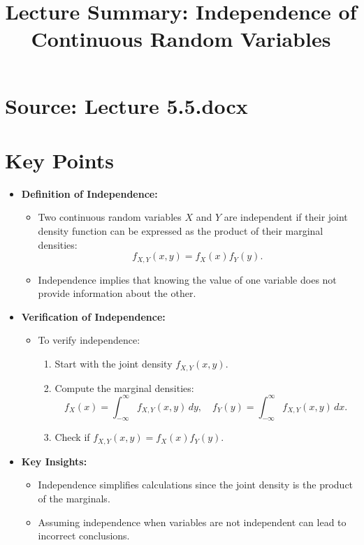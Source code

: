 \documentclass{article}
\title{Lecture Summary: Independence of Continuous Random Variables}
\author{}
\date{}
\begin{document}
\maketitle

\section*{Source: Lecture 5.5.docx}

\section*{Key Points}

\begin{itemize}
  \item \textbf{Definition of Independence:}
    \begin{itemize}
      \item Two continuous random variables $X$ and $Y$ are independent if their joint density function can be expressed as the product of their marginal densities:
        \[
          f_{X,Y}(x,y) = f_X(x) f_Y(y).
        \]
      \item Independence implies that knowing the value of one variable does not provide information about the other.
    \end{itemize}

  \item \textbf{Verification of Independence:}
    \begin{itemize}
      \item To verify independence:
        \begin{enumerate}
          \item Start with the joint density $f_{X,Y}(x,y)$.
          \item Compute the marginal densities:
            \[
              f_X(x) = \int_{-\infty}^\infty f_{X,Y}(x,y) \, dy, \quad f_Y(y) = \int_{-\infty}^\infty f_{X,Y}(x,y) \, dx.
            \]
          \item Check if $f_{X,Y}(x,y) = f_X(x) f_Y(y)$.
        \end{enumerate}
    \end{itemize}

  \item \textbf{Key Insights:}
    \begin{itemize}
      \item Independence simplifies calculations since the joint density is the product of the marginals.
      \item Assuming independence when variables are not independent can lead to incorrect conclusions.
    \end{itemize}


\end{itemize}
\end{document}
